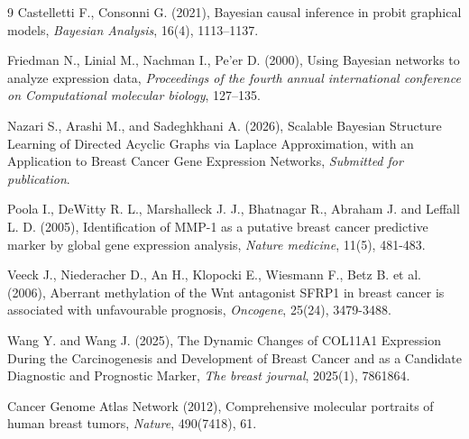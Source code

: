 \documentclass[twoside]{article}
\begin{document}
\vspace{-0.5cm}\small
\begin{thebibliography}{9}
Castelletti F., Consonni G. (2021), Bayesian causal inference in probit graphical models, {\it Bayesian Analysis}, 16(4), 1113--1137.

Friedman N., Linial M., Nachman I., Pe'er D. (2000), Using Bayesian networks to analyze expression data, {\it Proceedings of the fourth annual international conference on Computational molecular biology}, 127--135.

Nazari S., Arashi M., and Sadeghkhani A. (2026), Scalable Bayesian Structure Learning of Directed Acyclic Graphs via Laplace Approximation, with an Application to Breast Cancer Gene Expression Networks, {\it Submitted for publication}.

Poola I., DeWitty R. L., Marshalleck J. J., Bhatnagar R., Abraham J. and Leffall L. D. (2005), Identification of MMP-1 as a putative breast cancer predictive marker by global gene expression analysis, {\it Nature medicine}, 11(5), 481-483.

Veeck J., Niederacher D., An H., Klopocki E., Wiesmann F., Betz B. et al. (2006), Aberrant methylation of the Wnt antagonist SFRP1 in breast cancer is associated with unfavourable prognosis, {\it Oncogene}, 25(24), 3479-3488.

Wang Y. and Wang J. (2025), The Dynamic Changes of COL11A1 Expression During the Carcinogenesis and Development of Breast Cancer and as a Candidate Diagnostic and Prognostic Marker, {\it The breast journal}, 2025(1), 7861864.

Cancer Genome Atlas Network (2012), Comprehensive molecular portraits of human breast tumors, {\it Nature}, 490(7418), 61.

\end{thebibliography}
 
\end{document}
